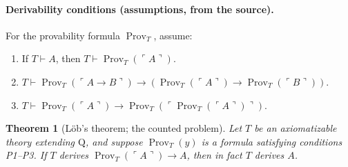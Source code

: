 \documentclass[UTF8,11pt]{ctexart}
\newtheorem*{theorem}{Theorem}
\theoremstyle{definition}
\begin{document}
\paragraph{Derivability conditions (assumptions, from the source).}
For the provability formula $\operatorname{Prov}_T$, assume:
\begin{enumerate}[label=P\arabic*.]
\item If $T\vdash A$, then $T\vdash\operatorname{Prov}_T(\ulcorner A\urcorner)$.
\item $T\vdash\operatorname{Prov}_T(\ulcorner A\to B\urcorner)\to(\operatorname{Prov}_T(\ulcorner A\urcorner)\to\operatorname{Prov}_T(\ulcorner B\urcorner))$.
\item $T\vdash\operatorname{Prov}_T(\ulcorner A\urcorner)\to\operatorname{Prov}_T(\ulcorner\operatorname{Prov}_T(\ulcorner A\urcorner)\urcorner)$.
\end{enumerate}
\begin{theorem}[L\"ob's theorem; the counted problem]
Let $T$ be an axiomatizable theory extending $\mathrm Q$, and suppose $\operatorname{Prov}_T(y)$ is a formula satisfying conditions P1--P3. If $T$ derives $\operatorname{Prov}_T(\ulcorner A\urcorner)\to A$, then in fact $T$ derives $A$.
\end{theorem}
\end{document}
